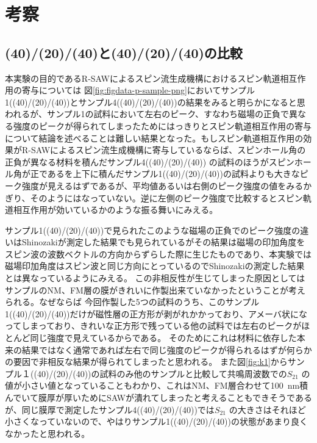\documentclass[dvipdfmx,11pt]{jsreport}
\numberwithin{equation}{chapter}
\numberwithin{table}{chapter}
\begin{document}
\chapter{考察}
\section{(40)/(20)/(40)と(40)/(20)/(40)の比較}
本実験の目的であるR-SAWによるスピン流生成機構におけるスピン軌道相互作用の寄与については
図\ref{fig:figdata-p-sample-png}においてサンプル1((40)/(20)/(40))とサンプル4((40)/(20)/(40))の結果をみると明らかになると思われるが、サンプル1の試料において左右のピーク、すなわち磁場の正負で異なる強度のピークが得られてしまったためにはっきりとスピン軌道相互作用の寄与について結論を述べることは難しい結果となった。もしスピン軌道相互作用の効果がR-SAWによるスピン流生成機構に寄与しているならば、スピンホール角の正負が異なる材料を積んだサンプル4((40)/(20)/(40))  の試料のほうがスピンホール角が正であるを上下に積んだサンプル1((40)/(20)/(40))の試料よりも大きなピーク強度が見えるはずであるが、平均値あるいは右側のピーク強度の値をみるかぎり、そのようにはなっていない。逆に左側のピーク強度で比較するとスピン軌道相互作用が効いているかのような振る舞いにみえる。

サンプル1((40)/(20)/(40))で見られたこのような磁場の正負でのピーク強度の違いはShinozakiが測定した結果でも見られているがその結果は磁場の印加角度をスピン波の波数ベクトルの方向からずらした際に生じたものであり、本実験では磁場印加角度はスピン波と同じ方向にとっているのでShinozakiの測定した結果とは異なっているようにみえる\cite{shi}。
この非相反性が生じてしまった原因としてはサンプルのNM、FM層の膜がきれいに作製出来ていなかったということが考えられる。なぜならば
今回作製した5つの試料のうち、このサンプル1((40)/(20)/(40))だけが磁性層の正方形が剥がれかかっており、アメーバ状になってしまっており、きれいな正方形で残っている他の試料では左右のピークがほとんど同じ強度で見えているからである。
そのためにこれは材料に依存した本来の結果ではなく通常であれば左右で同じ強度のピークが得られるはずが何らかの要因で非相反な結果が得られてしまったと思われる。
また図\ref{fig:k1}からサンプル１((40)/(20)/(40))の試料のみ他のサンプルと比較して共鳴周波数での$S_{21}$ の値が小さい値となっていることもわかり、これはNM、FM層合わせて\SI{100}{\nano \metre}積んでいて膜厚が厚いためにSAWが潰れてしまったと考えることもできそうであるが、同じ膜厚で測定したサンプル4((40)/(20)/(40))では$S_{21}$ の大きさはそれほど小さくなっていないので、やはりサンプル1((40)/(20)/(40))の状態があまり良くなかったと思われる。
\end{document}
